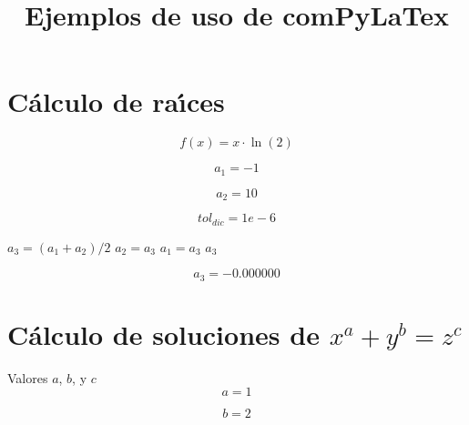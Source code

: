 \documentclass{article}
\title{Ejemplos de uso de comPyLaTex}
\author{}
\date{}
\begin{document}
\maketitle


\section{C\'alculo de ra\'{\i}ces}

\begin{equation}
f(x) = x \cdot \ln(2)
\label{eq:calc:f}
\end{equation}

\begin{equation}
a_1 = -1 
\label{eq:calc:a1}
\end{equation}

\begin{equation}
a_2 = 10
\label{eq:calc:a2}
\end{equation}

\begin{equation}
    tol_{dic} = 1e-6
    \label{eq:calc:toldic}
\end{equation}

\begin{algorithm}
\caption{M\'etodo de dicotom\'{\i}a}
\label{alg:calc:a3}
\begin{algorithmic}
        \STATE $a_3 = (a_1 + a_2)/2$
            \STATE $a_2 = a_3$
        \ELSE
            \STATE $a_1 = a_3$
        \ENDIF
    \ENDWHILE
    \RETURN $a_3$
\end{algorithmic}
\end{algorithm}


\begin{equation}
    a_3 = 
    -0.000000
    \label{eq:res:a3}
\end{equation}


\section{C\'alculo de soluciones de $x^a + y^b = z^c$}

Valores $a$, $b$, y $c$
\begin{equation}
a = 1
\label{eq:calc:a}
\end{equation}

\begin{equation}
b = 2
\label{eq:calc:b}
\end{equation}
\end{document}
